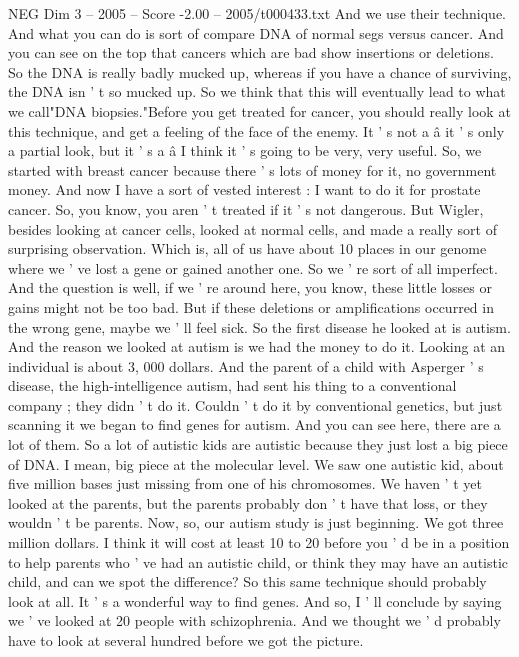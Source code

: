 \begin{textsample}{NEG Dim 3 – 2005 – Score -2.00 – 2005/t000433.txt}
And we use their technique.
And what you can do is sort of compare DNA of normal segs versus cancer.
And you can see on the top that cancers which are bad show insertions or deletions.
So the DNA is really badly mucked up, whereas if you have a chance of surviving, the DNA isn ' t so mucked up.
So we think that this will eventually lead to what we call"DNA biopsies."Before you get treated for cancer, you should really look at this technique, and get a feeling of the face of the enemy.
It ' s not a â it ' s only a partial look, but it ' s a â I think it ' s going to be very, very useful.
So, we started with breast cancer because there ' s lots of money for it, no government money.
And now I have a sort of vested interest : I want to do it for prostate cancer.
So, you know, you aren ' t treated if it ' s not dangerous.
But Wigler, besides looking at cancer cells, looked at normal cells, and made a really sort of surprising observation.
Which is, all of us have about 10 places in our genome where we ' ve lost a gene or gained another one.
So we ' re sort of all imperfect.
And the question is well, if we ' re around here, you know, these little losses or gains might not be too bad.
But if these deletions or amplifications occurred in the wrong gene, maybe we ' ll feel sick.
So the first disease he looked at is autism.
And the reason we looked at autism is we had the money to do it.
Looking at an individual is about 3, 000 dollars.
And the parent of a child with Asperger ' s disease, the high-intelligence autism, had sent his thing to a conventional company ; they didn ' t do it.
Couldn ' t do it by conventional genetics, but just scanning it we began to find genes for autism.
And you can see here, there are a lot of them.
So a lot of autistic kids are autistic because they just lost a big piece of DNA.
I mean, big piece at the molecular level.
We saw one autistic kid, about five million bases just missing from one of his chromosomes.
We haven ' t yet looked at the parents, but the parents probably don ' t have that loss, or they wouldn ' t be parents.
Now, so, our autism study is just beginning.
We got three million dollars.
I think it will cost at least 10 to 20 before you ' d be in a position to help parents who ' ve had an autistic child, or think they may have an autistic child, and can we spot the difference?
So this same technique should probably look at all.
It ' s a wonderful way to find genes.
And so, I ' ll conclude by saying we ' ve looked at 20 people with schizophrenia.
And we thought we ' d probably have to look at several hundred before we got the picture.

\end{textsample}
